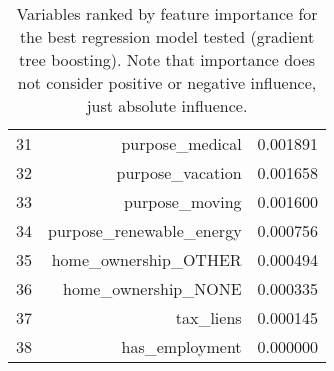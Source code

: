 \begin{table}[!ht]
\begin{tabular}{crc}
31 & purpose\_medical & 0.001891 \\
32 & purpose\_vacation & 0.001658 \\
33 & purpose\_moving & 0.001600 \\
34 & purpose\_renewable\_energy & 0.000756 \\
35 & home\_ownership\_OTHER & 0.000494 \\
36 & home\_ownership\_NONE & 0.000335 \\
37 & tax\_liens & 0.000145 \\
38 & has\_employment & 0.000000 \\
\bottomrule
\end{tabular}
\caption{Variables ranked by feature importance for the best regression model tested (gradient tree boosting). Note that importance does not consider positive or negative influence, just absolute influence. }
\label{table:regression_importances}
\end{table}